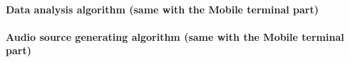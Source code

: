 \paragraph{Data analysis algorithm (same with the Mobile terminal part)}

\paragraph{Audio source generating algorithm (same with the Mobile terminal
  part)} 

